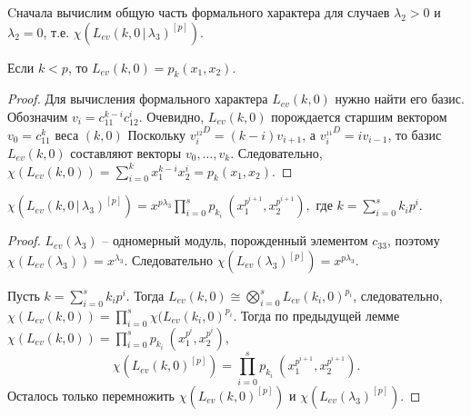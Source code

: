 Cначала вычислим общую часть формального характера для случаев $ \lambda_2 > 0 $ и $ \lambda_2 = 0 $, т.е. $ \chi(L_{ev}(k, 0 \,|\, \lambda_3)^{[p]}) $.
%
\begin{lemma}
Если $ k < p $, то $ L_{ev}(k, 0) = p_k (x_1, x_2) $. 
\end{lemma}
\begin{proof}
Для вычисления формального характера $ L_{ev}(k, 0) $ нужно найти его базис.\\
Обозначим $ v_i = c_{11}^{k - i} c_{12}^i $.
Очевидно, $ L_{ev}(k, 0) $ порождается старшим вектором $ v_0 = c_{11}^k $ веса $(k, 0)$
Поскольку $ v_i^{_{12}D} = (k - i) v_{i + 1} $, а $ v_i^{_{11}D} = i v_{i - 1} $, то базис $ L_{ev}(k, 0) $ составляют векторы $ v_0, \ldots, v_k $.
Следовательно, $ \chi (L_{ev}(k, 0)) = \sum\limits_{i = 0}^k x_1^{k - i} x_2^i = p_k (x_1, x_2) $.
\end{proof}

\begin{lemma}
$ \chi(L_{ev}(k, 0 \,|\, \lambda_3)^{[p]}) = x^{p\lambda_3} \prod\limits_{i = 0}^s p_{k_i} ~(x_1^{p^{i + 1}}, x_2^{p^{i + 1}}), $
где $ k = \sum\limits_{i = 0}^{s} k_i p^i $.
\end{lemma}
\begin{proof}
$ L_{ev}(\lambda_3) $ -- одномерный модуль, порожденный элементом $c_{33}$, поэтому $ \chi(L_{ev}(\lambda_3)) = x^{\lambda_3} $. 
Следовательно $ \chi(L_{ev}(\lambda_3)^{[p]}) = x^{p\lambda_3} $.

Пусть $ k = \sum\limits_{i = 0}^{s} k_i p^i $. Тогда $ L_{ev}(k, 0) \cong \bigotimes\limits_{i = 0}^s L_{ev}(k_i, 0)^{p_i} $, 
следовательно, $ \chi (L_{ev}(k, 0)) = \prod\limits_{i = 0}^s \chi (L_{ev}(k_i, 0)^{p_i} $. Тогда по предыдущей лемме 
$ \chi (L_{ev}(k, 0)) = \prod\limits_{i = 0}^s p_{k_i} ~(x_1^{p^i}, x_2^{p^i}) $, 
$$ \chi (L_{ev}(k, 0)^{[p]}) = \prod\limits_{i = 0}^s p_{k_i} ~(x_1^{p^{i + 1}}, x_2^{p^{i + 1}}). $$
Осталось только перемножить $ \chi (L_{ev}(k, 0)^{[p]}) $ и $ \chi (L_{ev}(\lambda_3)^{[p]}) $.
\end{proof}
